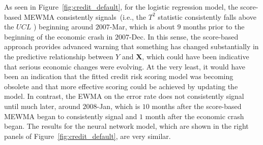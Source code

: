 \documentclass[twoside,11pt]{article}
\begin{document}
As seen in Figure~\ref{fig:credit_default}, for the logistic regression model, the score-based MEWMA consistently signals~(i.e., the $T^2$ statistic consistently falls above the $UCL$ ) beginning around $2007$-Mar, which is about $9$ months prior to the beginning of the economic crash in $2007$-Dec. In this sense, the score-based approach provides advanced warning that something has changed substantially in the predictive relationship between $Y$ and $\bm{X}$, which could have been indicative that serious economic changes were evolving. At the very least, it would have been an indication that the fitted credit risk scoring model was becoming obsolete and that more effective scoring could be achieved by updating the model. In contrast, the EWMA on the error rate does not consistently signal until much later, around $2008$-Jan, which is $10$ months after the score-based MEWMA began to consistently signal and $1$ month after the economic crash began. The results for the neural network model, which  are shown in the right panels of Figure~\ref{fig:credit_default}, are very similar. 
\end{document}
